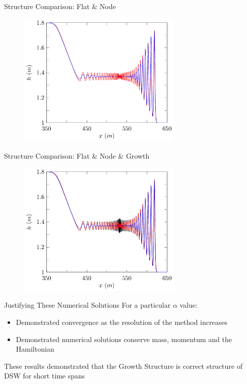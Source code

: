 \documentclass[pdf]{beamer}
\begin{document}
\begin{frame}{Structure Comparison: Flat \& Node}
	\begin{figure}
		\includegraphics[width=0.7\textwidth]{./Pictures/Results/Example/69.pdf}
	\end{figure}
\end{frame}

\begin{frame}{Structure Comparison: Flat \& Node \& Growth}
	\begin{figure}
		\includegraphics[width=0.7\textwidth]{./Pictures/Results/Example/6912.pdf}
	\end{figure}
\end{frame}

\begin{frame}{Justifying These Numerical Solutions}
	For a particular $\alpha$ value:
	\begin{itemize}
		\item Demonstrated convergence as the resolution of the method increases
		\item Demonstrated numerical solutions conserve mass, momentum and the Hamiltonian
	\end{itemize}
	These results demonstrated that the Growth Structure is correct structure of DSW for short time spans
\end{frame}
\end{document}
